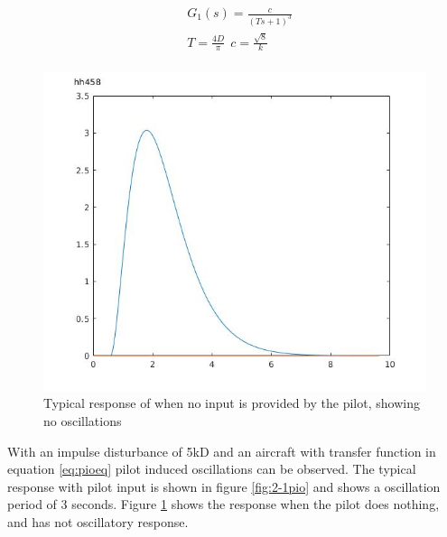 \documentclass[twoside,twocolumn]{article}
\begin{document}
\begin{equation}
\label{eq:pioeq}
\begin{split}
&G_1(s)=\frac{c}{(Ts+1)^3}\\
&T=\frac{4D}{\pi}\:\:c=\frac{\sqrt{8}}{k}\\
\end{split}
\end{equation}



 \begin{figure}[h]
  \centering
    \includegraphics[width=\linewidth]{2-1_zero_input}
  \caption{Typical response of when no input is provided by the pilot, showing no oscillations}
  \label{fig:2-1zero}
\end{figure}

With an impulse disturbance of 5kD and an aircraft with transfer function in equation \ref{eq:pioeq} pilot induced oscillations can be observed. The typical response with pilot input is shown in figure \ref{fig:2-1pio} and shows a oscillation period of 3 seconds. Figure \ref{fig:2-1zero} shows the response when the pilot does nothing, and has not oscillatory response.
\newline
\end{document}
